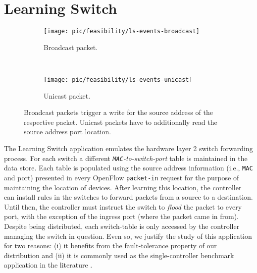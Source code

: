 \section{Learning Switch}
\label{sec:feasibility:ls}
\glsresetall

\begin{figure}[ht]

  \begin{subfigure}[b]{0.5\textwidth}
                \centering
                \texttt{[image: pic/feasibility/ls-events-broadcast]}
                \caption{Broadcast packet.}
                \label{fig:ls:interaction:broadcast}
        \end{subfigure}%
        ~
        \begin{subfigure}[b]{0.5\textwidth}
                \centering
                \texttt{[image: pic/feasibility/ls-events-unicast]}
                \caption{Unicast packet.}
                \label{fig:ls:interaction:unicast}
        \end{subfigure}
        \caption[Learning Switch workloads]{Broadcast packets trigger a write for the source address of the respective packet. Unicast packets have to additionally read the source address port location.}
        \label{fig:ls:interaction}
\end{figure}

The Learning Switch application emulates the hardware layer 2 switch
forwarding process. 
For each switch a different \emph{\texttt{MAC}-to-switch-port}
table is maintained in the data store. 
Each table is populated using the source address information (i.e.,
\texttt{MAC} and port)  presented in every OpenFlow \texttt{packet-in}
request for the purpose of maintaining the location of devices. 
After learning this location, the controller can install
rules in the switches to forward packets from a source to a
destination. 
Until then, the controller must instruct the switch to
\emph{flood} the packet to every port, with the exception of
the ingress port (where the packet came in from). Despite being distributed, each switch-table is
only accessed by the controller managing the switch in
question. 
Even so, we justify the study  of this application for two
reasons: (i) it benefits from the fault-tolerance property of
our distribution and (ii) it is commonly used as the
single-controller benchmark application in the literature \cite{Tootoonchian:2012uia}. 


